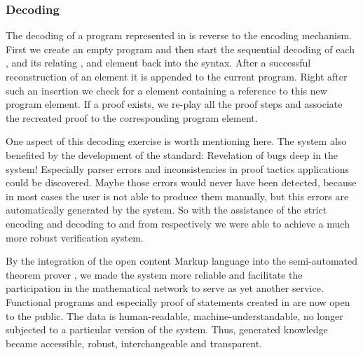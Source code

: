 \subsubsection{Decoding}

The decoding of a {\verifun} program represented in {\omdoc} is reverse to the encoding
mechanism. First we create an empty program and then start the sequential decoding of each
{}, {} and its relating {}, and
{} element back into the {\fp} syntax. After a successful
reconstruction of an element it is appended to the current program. Right after such an
insertion we check for a {} element containing a reference to this new
program element. If a proof exists, we re-play all the proof steps and associate the
recreated {\verifun} proof to the corresponding program element.

One aspect of this decoding exercise is worth mentioning here. The {\verifun} system also
benefited by the development of the {\omdoc} standard: Revelation of bugs deep in the
system! Especially {\fp} parser errors and inconsistencies in proof tactics applications
could be discovered. Maybe those errors would never have been detected, because in most
cases the user is not able to produce them manually, but this errors are automatically
generated by the system. So with the assistance of the strict encoding and decoding to and
from {\omdoc} respectively we were able to achieve a much more robust verification system.

By the integration of the open content Markup language {\omdoc} into the semi-automated
theorem prover {\verifun}, we made the system more reliable and facilitate the
participation in the mathematical network to serve as yet another service. Functional
programs and especially proof of statements created in {\verifun} are now open to the
public. The data is human-readable, machine-understandable, no longer subjected to a
particular version of the system. Thus, {\verifun} generated knowledge became accessible,
robust, interchangeable and transparent.


